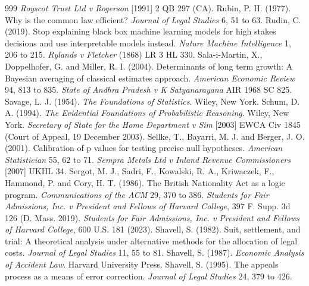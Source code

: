 \begin{thebibliography}{999}
 \emph{Royscot Trust Ltd v Rogerson} [1991] 2 QB 297 (CA).
 Rubin, P. H. (1977). Why is the common law efficient? \emph{Journal of Legal Studies} 6, 51 to 63.
 Rudin, C. (2019). Stop explaining black box machine learning models for high stakes decisions and use interpretable models instead. \emph{Nature Machine Intelligence} 1, 206 to 215.
 \emph{Rylands v Fletcher} (1868) LR 3 HL 330.
 Sala-i-Martin, X., Doppelhofer, G. and Miller, R. I. (2004). Determinants of long term growth: A Bayesian averaging of classical estimates approach. \emph{American Economic Review} 94, 813 to 835.
 \emph{State of Andhra Pradesh v K Satyanarayana} AIR 1968 SC 825.
 Savage, L. J. (1954). \emph{The Foundations of Statistics}. Wiley, New York.
 Schum, D. A. (1994). \emph{The Evidential Foundations of Probabilistic Reasoning}. Wiley, New York.
 \emph{Secretary of State for the Home Department v Sim} [2003] EWCA Civ 1845 (Court of Appeal, 19 December 2003).
 Sellke, T., Bayarri, M. J. and Berger, J. O. (2001). Calibration of p values for testing precise null hypotheses. \emph{American Statistician} 55, 62 to 71.
 \emph{Sempra Metals Ltd v Inland Revenue Commissioners} [2007] UKHL 34.
 Sergot, M. J., Sadri, F., Kowalski, R. A., Kriwaczek, F., Hammond, P. and Cory, H. T. (1986). The British Nationality Act as a logic program. \emph{Communications of the ACM} 29, 370 to 386.
 \emph{Students for Fair Admissions, Inc. v President and Fellows of Harvard College}, 397 F. Supp. 3d 126 (D. Mass. 2019).
 \emph{Students for Fair Admissions, Inc. v President and Fellows of Harvard College}, 600 U.S. 181 (2023).
 Shavell, S. (1982). Suit, settlement, and trial: A theoretical analysis under alternative methods for the allocation of legal costs. \emph{Journal of Legal Studies} 11, 55 to 81.
 Shavell, S. (1987). \emph{Economic Analysis of Accident Law}. Harvard University Press.
 Shavell, S. (1995). The appeals process as a means of error correction. \emph{Journal of Legal Studies} 24, 379 to 426.

\end{thebibliography}
